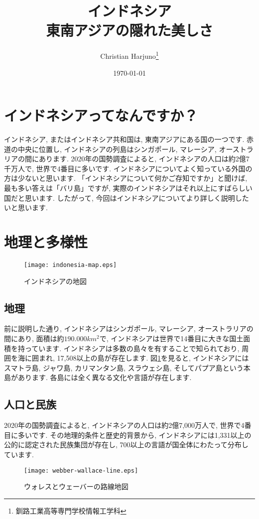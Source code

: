 \documentclass[a4j, twocolumn]{jarticle}
\begin{document}
  \title{インドネシア \\\large 東南アジアの隠れた美しさ}
  \author{Christian Harjuno\thanks{釧路工業高等専門学校情報工学科}}
  \date{\today}
  \maketitle
  \section{インドネシアってなんですか？}
  インドネシア, またはインドネシア共和国は, 東南アジアにある国の一つです. 赤道の中央に位置し, インドネシアの列島はシンガポール, マレーシア, オーストラリアの間にあります. 2020年の国勢調査によると, インドネシアの人口は約2億7千万人で, 世界で4番目に多いです. 
  インドネシアについてよく知っている外国の方は少ないと思います. 「インドネシアについて何かご存知ですか」と聞けば, 最も多い答えは「バリ島」ですが, 実際のインドネシアはそれ以上にすばらしい国だと思います. したがって, 今回はインドネシアについてより詳しく説明したいと思います. 
  \section{地理と多様性}
  \begin{figure}
    \centering
    \texttt{[image: indonesia-map.eps]}
    \caption{インドネシアの地図}\label{indonesiamap}
  \end{figure}
  \subsection{地理}
  前に説明した通り, インドネシアはシンガポール, マレーシア, オーストラリアの間にあり, 面積は約$190.000 km^2$で, インドネシアは世界で14番目に大きな国土面積を持っています. インドネシアは多数の島々を有することで知られており, 周囲を海に囲まれ, 17,508以上の島が存在します\cite{ANDREFOUET2022104848}. 図\ref{indonesiamap}を見ると, インドネシアにはスマトラ島, ジャワ島, カリマンタン島, スラウェシ島, そしてパプア島という本島があります. 各島には全く異なる文化や言語が存在します.\\
  \subsection{人口と民族}
  2020年の国勢調査によると, インドネシアの人口は約2億7,000万人で, 世界で4番目に多いです\cite{unstats2023}. その地理的条件と歴史的背景から, インドネシアには1,331以上の公的に認定された民族集団が存在し, 700以上の言語が国全体にわたって分布しています.\\
  \begin{figure}
    \centering
    \texttt{[image: webber-wallace-line.eps]}
    \caption{ウォレスとウェーバーの路線地図}\label{wallaceweber}
  \end{figure}
\end{document}

